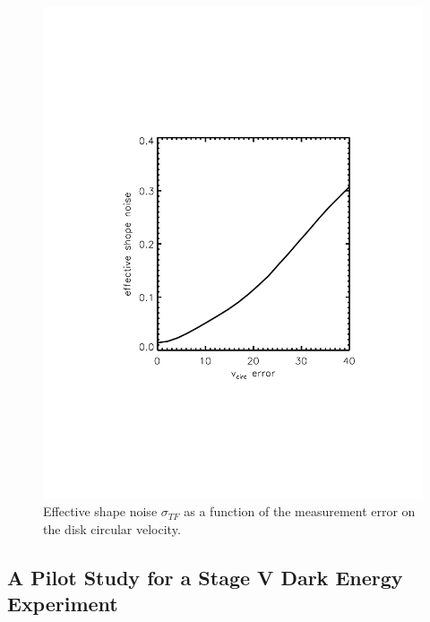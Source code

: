 \documentclass[usenatbib]{aastex}
\begin{document}
\begin{figure}[t]
\includegraphics[width=\linewidth, bb= 150 150 550 650,clip]{Plots/vcirc_error.pdf}
\caption{Effective shape noise $\sigma_{TF}$ as a  function of the
  measurement error on the disk circular velocity.}
\label{fig:shapeNoise}
\end{figure}

\subsection{}


\subsection{A Pilot Study for a Stage V Dark Energy Experiment}
\end{document}

